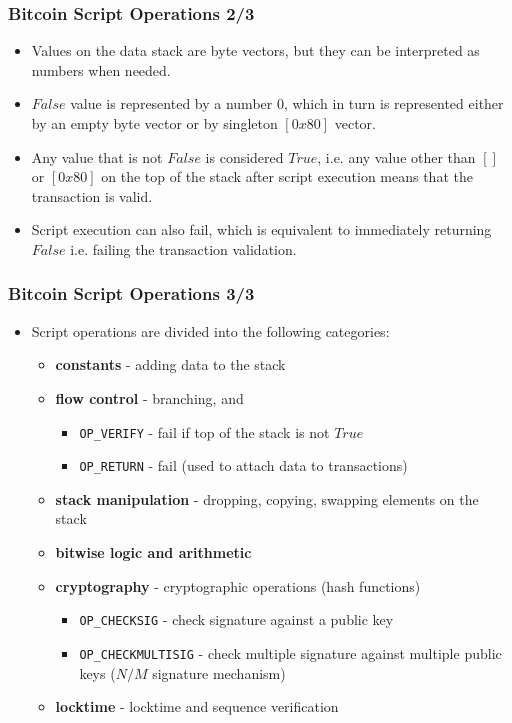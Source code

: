\documentclass{beamer}
\begin{document}
\begin{frame}[fragile]
  \frametitle{Bitcoin Script Operations 2/3}
  \begin{itemize}
  \item Values on the data stack are byte vectors, but they can be interpreted
    as numbers when needed.
  \item $False$ value is represented by a number 0, which in turn is represented
    either by an empty byte vector or by singleton $[0x80]$ vector.
  \item Any value that is not $False$ is considered $True$, i.e. any value other
    than $[]$ or $[0x80]$ on the top of the stack after script execution means
    that the transaction is valid.
  \item Script execution can also fail, which is equivalent to immediately
    returning $False$ i.e. failing the transaction validation.
  \end{itemize}
\end{frame}

\begin{frame}[fragile]
  \frametitle{Bitcoin Script Operations 3/3}
  \begin{itemize}
  \item Script operations are divided into the following categories:
    \begin{itemize}
    \item \textbf{constants} - adding data to the stack
    \item \textbf{flow control} - branching, and
      \begin{itemize}
      \item \texttt{OP_VERIFY} - fail if top of the stack is not
        $True$
      \item \texttt{OP_RETURN} - fail (used to attach data to
        transactions)
      \end{itemize}
    \item \textbf{stack manipulation} - dropping, copying, swapping elements on
      the stack
    \item \textbf{bitwise logic and arithmetic}
    \item \textbf{cryptography} - cryptographic operations (hash functions)
      \begin{itemize}
      \item \texttt{OP_CHECKSIG} - check signature against a public
        key
      \item \texttt{OP_CHECKMULTISIG} - check multiple signature
        against multiple public keys ($N/M$ signature mechanism)
      \end{itemize}
    \item \textbf{locktime} - locktime and sequence verification
    \end{itemize}
  \end{itemize}
\end{frame}
\end{document}

